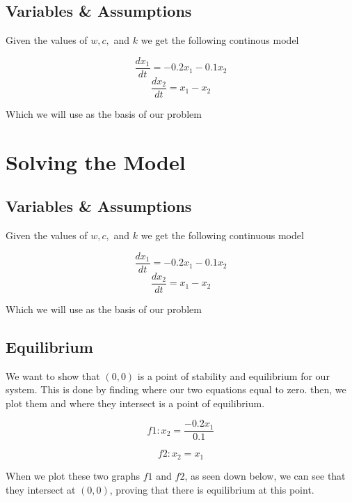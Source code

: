 \documentclass[12pt]{report}
\begin{document}
\subsection{Variables \& Assumptions}
\begin{flushleft}
Given the values of $w, c,$ and $k$ we get the following continous model 
\end{flushleft} 
$$\dfrac{dx_{1}}{dt} = -0.2x_{1} - 0.1x_{2}$$
$$\dfrac{dx_{2}}{dt} = x_{1} - x_{2}$$
\begin{flushleft} 
Which we will use as the basis of our problem
\end{flushleft} 
\section{Solving the Model}
\subsection{Variables \& Assumptions}
\begin{flushleft}
Given the values of $w, c,$ and $k$ we get the following continuous model 
\end{flushleft} 
$$\dfrac{dx_{1}}{dt} = -0.2x_{1} - 0.1x_{2}$$
$$\dfrac{dx_{2}}{dt} = x_{1} - x_{2}$$
\begin{flushleft} 
Which we will use as the basis of our problem
\end{flushleft} 
\subsection{Equilibrium}
\begin{flushleft} 
We want to show that $(0,0)$ is a point of stability and equilibrium for our system. This is done by finding where our two equations equal to zero. then, we plot them and where they intersect is a point of equilibrium. 
\end{flushleft}
$$f1: x_{2} = \dfrac{-0.2x_{1}}{0.1}$$

$$f2: x_{2} = x_{1}$$
\begin{flushleft} 
When we plot these two graphs $f1$ and $f2$, as seen down below, we can see that they intersect at $(0,0)$, proving that there is equilibrium at this point. 
\end{flushleft}

\begin{center} 
\end{center}
\end{document}
